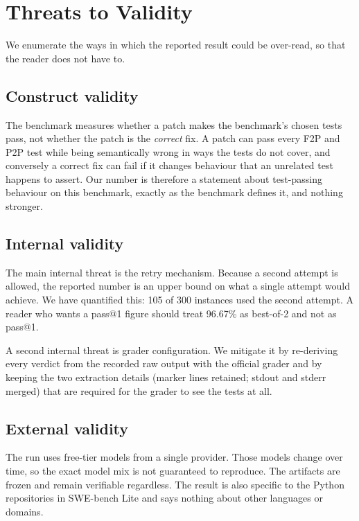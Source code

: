 \documentclass[11pt,a4paper]{article}
\begin{document}
\section{Threats to Validity}
\label{sec:threats}

We enumerate the ways in which the reported result could be over-read, so that the
reader does not have to.

\subsection{Construct validity}

The benchmark measures whether a patch makes the benchmark's chosen tests pass, not
whether the patch is the \emph{correct} fix. A patch can pass every F2P and P2P test
while being semantically wrong in ways the tests do not cover, and conversely a correct
fix can fail if it changes behaviour that an unrelated test happens to assert. Our
number is therefore a statement about test-passing behaviour on this benchmark, exactly
as the benchmark defines it, and nothing stronger.

\subsection{Internal validity}

The main internal threat is the retry mechanism. Because a second attempt is allowed,
the reported number is an upper bound on what a single attempt would achieve. We have
quantified this: 105 of 300 instances used the second attempt. A reader who wants a
pass@1 figure should treat 96.67\% as best-of-2 and not as pass@1.

A second internal threat is grader configuration. We mitigate it by re-deriving every
verdict from the recorded raw output with the official grader and by keeping the two
extraction details (marker lines retained; stdout and stderr merged) that are required
for the grader to see the tests at all.

\subsection{External validity}

The run uses free-tier models from a single provider. Those models change over time, so
the exact model mix is not guaranteed to reproduce. The artifacts are frozen and remain
verifiable regardless. The result is also specific to the Python repositories in
SWE-bench Lite and says nothing about other languages or domains.
\end{document}
